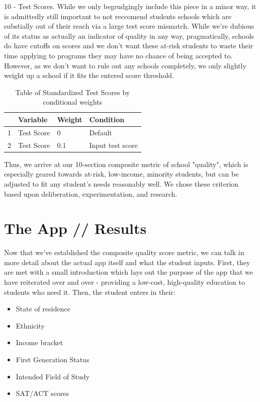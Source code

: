 \documentclass{article}\usepackage[]{graphicx}\usepackage[]{color}
\begin{document}
10 - Test Scores. While we only begrudgingly include this piece in a minor way, it is admittedly still important to not reccomend students schools which are substially out of their reach via a large test score mismatch. While we're dubious of its status as actually an indicator of quality in any way, pragmatically, schools do have cutoffs on scores and we don't want these at-risk students to waste their time applying to programs they may have no chance of being accepted to. However, as we don't want to rule out any schools completely, we only slightly weight up a school if it fits the entered score threshold.

\begin{table}[ht]
\centering
\begin{tabular}{rlll}
  \hline
 & Variable & Weight & Condition \\ 
  \hline
1 & Test Score & 0 & Default \\ 
  2 & Test Score & 0.1 & Input test score \\ 
   \hline
\end{tabular}
\caption{Table of Standardized Test Scores by conditional weights} 
\end{table}


Thus, we arrive at our 10-section composite metric of school "quality", which is especially geared towards at-risk, low-income, minority students, but can be adjusted to fit any student's needs reasonably well. We chose these criterion based upon deliberation, experimentation, and research. 
\maketitle
\section{The App // Results}


Now that we've established the composite quality score metric, we can talk in more detail about the actual app itself and what the student inputs. First, they are met with a small introduction which lays out the purpose of the app that we have reiterated over and over - providing a low-cost, high-quality education to students who need it. Then, the student enters in their:
\begin{itemize}
\item State of residence
\item Ethnicity
\item Income bracket
\item First Generation Status
\item Intended Field of Study
\item SAT/ACT scores
\end{itemize}
\end{document}
